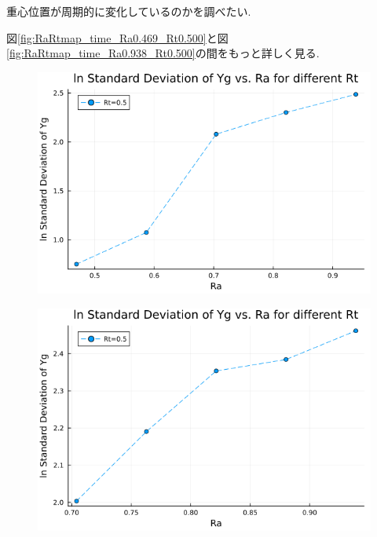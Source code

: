 重心位置が周期的に変化しているのかを調べたい.

図\ref{fig:RaRtmap_time_Ra0.469_Rt0.500}と図\ref{fig:RaRtmap_time_Ra0.938_Rt0.500}の間をもっと詳しく見る.



\begin{figure}[H]
  \centering
  \includegraphics[scale=0.5]{image/lnStdYg_Ra0.4693845to0.98769_Rt0.5_ti25000.png}
  \caption{}
  \label{}
\end{figure}




\begin{figure}[H]
  \centering
  \includegraphics[scale=0.5]{image/lnStdYg_Ra0.70407675to0.98769_Rt0.5_ti25000.png}
  \caption{}
  \label{}
\end{figure}


